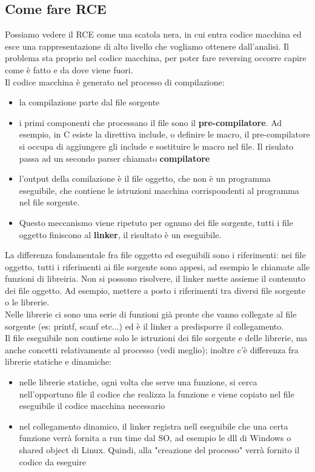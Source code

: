 \documentclass{article}
\begin{document}
\subsection{Come fare RCE}
Possiamo vedere il RCE come una scatola nera, in cui entra codice macchina ed esce una rappresentazione di alto livello che vogliamo ottenere dall'analisi. Il problema sta proprio nel codice macchina, per poter fare reversing occorre capire come è fatto e da dove viene fuori.\\ Il codice macchina è generato nel processo di compilazione:
\begin{itemize}
\item la compilazione parte dal file sorgente
\item i primi componenti che processano il file sono il \textbf{pre-compilatore}. Ad esempio, in C esiste la direttiva \textsf{include}, o definire le macro, il pre-compilatore si occupa di aggiungere gli include e sostituire le macro nel file. Il risulato passa ad un secondo parser chiamato \textbf{compilatore}
\item l'output della comilazione è il file oggetto, che non è un programma eseguibile, che contiene le istruzioni macchina corrispondenti al programma nel file sorgente. 
\item Questo meccanismo viene ripetuto per ognuno dei file sorgente, tutti i file oggetto finiscono al \textbf{linker}, il risultato è un eseguibile.
\end{itemize}
La differenza fondamentale fra file oggetto ed eseguibili sono i riferimenti: nei file oggetto, tutti i riferimenti ai file sorgente sono appesi, ad esempio le chiamate alle funzioni di libreiria. Non si possono risolvere, il linker mette assieme il contenuto dei file oggetto. Ad esempio, mettere a posto i riferimenti tra diversi file sorgente o le librerie.\\ Nelle librerie ci sono una serie di funzioni già pronte che vanno collegate al file sorgente (es: printf, scanf etc...) ed è il linker a predisporre il collegamento.\\ Il file eseguibile non contiene solo le istruzioni dei file sorgente e delle librerie, ma anche concetti relativamente al processo (vedi meglio); inoltre c'è differenza fra librerie statiche e dinamiche:
\begin{itemize}
\item nelle librerie statiche, ogni volta che serve una funzione, si cerca nell'opportuno file il codice che realizza la funzione e viene copiato nel file eseguibile il codice macchina necessario
\item nel collegamento dinamico, il linker registra nell eseguibile che una certa funzione verrà fornita a run time dal SO, ad esempio le dll di Windows o shared object di Linux. Quindi, alla "creazione del processo" verrà fornito il codice da eseguire
\end{itemize}
\end{document}
